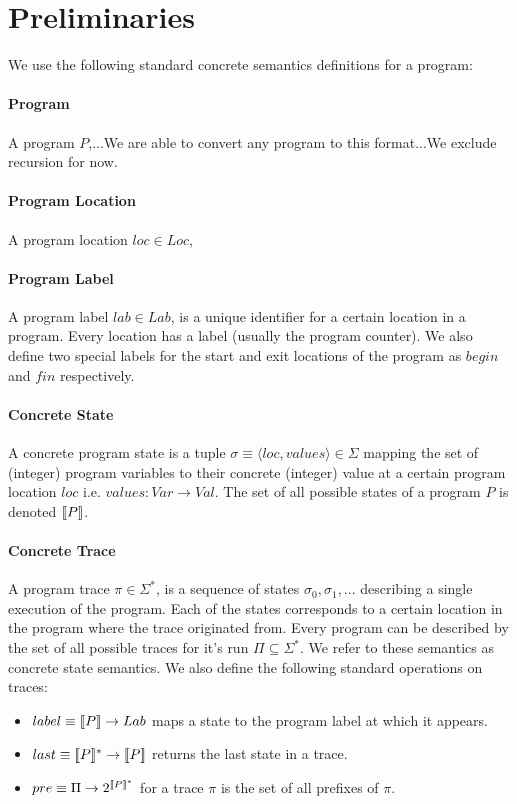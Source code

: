 \section{Preliminaries} 
We use the following standard concrete semantics definitions for a program:

\paragraph{Program}  A program $P$,...We are able to convert any program to this format...We exclude recursion for now.


\paragraph{Program Location} 
A program location $loc \in Loc$,

\paragraph{Program Label} 
A program label $lab \in Lab$, is a unique identifier for a certain location in a program. Every location has a label (usually the program counter). We also define two special labels for the start and exit locations of the program as $begin$ and $fin$ respectively.

\paragraph{Concrete State} 
A concrete program state is a tuple $\sigma \equiv \langle loc, values \rangle \in \Sigma$ mapping the set of (integer) program variables to their concrete (integer) value at a certain program location $loc$ i.e. $values : Var \rightarrow Val$. The set of all possible states of a program $P$ is denoted $\lbrack\!\lbrack P \rbrack\!\rbrack$.

\paragraph{Concrete Trace} 
A program trace $\pi \in \Sigma^*$, is a sequence of states $\sigma_0,\sigma_1,...$ describing a single execution of the program. Each of the states corresponds to a certain location in the program where the trace originated from. Every program can be described by the set of all possible traces for it's run $\Pi \subseteq \Sigma^*$. We refer to these semantics as concrete state semantics. We also define the following standard operations on traces:
\begin{itemize}
\item $label \equiv \lbrack\!\lbrack P \rbrack\!\rbrack \rightarrow Lab$ maps a state to the program label at which it appears.
\item $last \equiv \lbrack\!\lbrack P \rbrack\!\rbrack^* \rightarrow \lbrack\!\lbrack P \rbrack\!\rbrack$ returns the last state in a trace.
\item $pre \equiv \Pi \rightarrow 2^{\lbrack\!\lbrack P \rbrack\!\rbrack^*}$ for a trace $\pi$ is the set of all prefixes of $\pi$.
\end{itemize}

